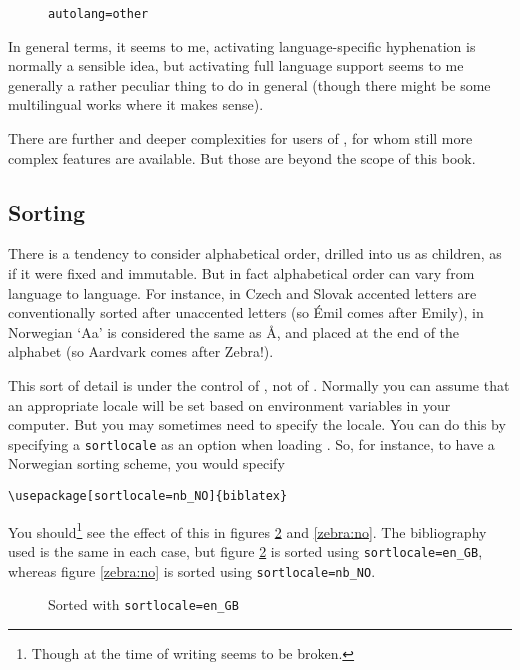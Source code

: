 \begin{figure}
\caption{\texttt{autolang=other}\label{proust2}}
\end{figure}

In general terms, it seems to me, activating language-specific
hyphenation is normally a sensible idea, but activating full language
support seems to me generally a rather peculiar thing to do in general
(though there might be some multilingual works where it makes sense).

There are further and deeper complexities for users of
, for whom still more complex features are
available. But those are beyond the scope of this book.

\subsection{Sorting}

There is a tendency to consider alphabetical order, drilled into us as
children, as if it were fixed and immutable. But in fact alphabetical
order can vary from language to language. For instance, in Czech and
Slovak accented letters are conventionally sorted after unaccented
letters (so \'{E}mil comes after Emily), in Norwegian `Aa' is
considered the same as \r{A}, and placed at the end of the alphabet
(so Aardvark comes after Zebra!).

This sort of detail is under the control of , not of
\biblatex. Normally you can assume that an appropriate locale will be
set based on environment variables in your computer. But you may
sometimes need to specify the locale. You can do this by specifying a
\texttt{sortlocale} as an option when loading \biblatex. So, for
instance, to have a Norwegian sorting scheme, you would specify
\begin{verbatim}
\usepackage[sortlocale=nb_NO]{biblatex}
\end{verbatim}

You should\footnote{Though at the time of writing 
  seems to be broken.} see the effect of this in figures
\ref{zebra:en} and \ref{zebra:no}. The bibliography used is the same
in each case, but figure \ref{zebra:en} is sorted using
\texttt{sortlocale=en\_GB}, whereas figure \ref{zebra:no} is sorted
using \texttt{sortlocale=nb\_NO}.

\begin{figure}
\caption{Sorted with \texttt{sortlocale=en\_GB}\label{zebra:en}}
\end{figure}

